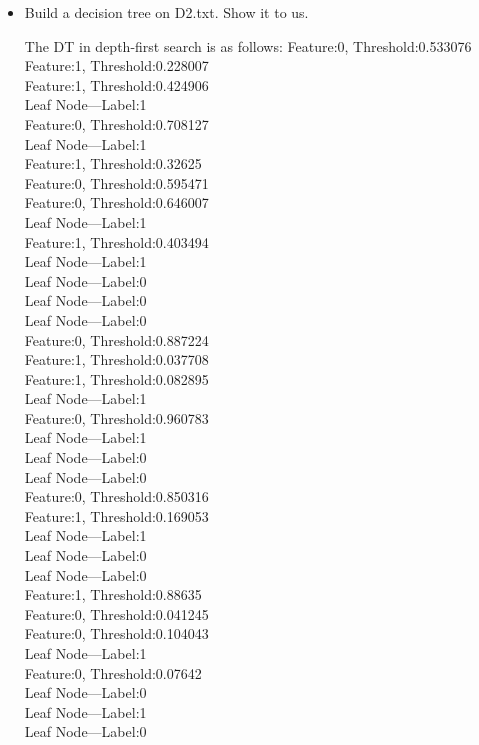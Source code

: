 \documentclass[a4paper]{article}
\theoremstyle{definition}
\newenvironment{soln}{
    \leavevmode\color{blue}\ignorespaces
}{}
\begin{document}
\begin{enumerate}
\begin{itemize}
  \item Build a decision tree on D2.txt.  Show it to us.\\ 
  \begin{soln}
      The DT in depth-first search is as follows:
      Feature:0, Threshold:0.533076\\
Feature:1, Threshold:0.228007\\
Feature:1, Threshold:0.424906\\
Leaf Node---Label:1\\
Feature:0, Threshold:0.708127\\
Leaf Node---Label:1\\
Feature:1, Threshold:0.32625\\
Feature:0, Threshold:0.595471\\
Feature:0, Threshold:0.646007\\
Leaf Node---Label:1\\
Feature:1, Threshold:0.403494\\
Leaf Node---Label:1\\
Leaf Node---Label:0\\
Leaf Node---Label:0\\
Leaf Node---Label:0\\
Feature:0, Threshold:0.887224\\
Feature:1, Threshold:0.037708\\
Feature:1, Threshold:0.082895\\
Leaf Node---Label:1\\
Feature:0, Threshold:0.960783\\
Leaf Node---Label:1\\
Leaf Node---Label:0\\
Leaf Node---Label:0\\
Feature:0, Threshold:0.850316\\
Feature:1, Threshold:0.169053\\
Leaf Node---Label:1\\
Leaf Node---Label:0\\
Leaf Node---Label:0\\
Feature:1, Threshold:0.88635\\
Feature:0, Threshold:0.041245\\
Feature:0, Threshold:0.104043\\
Leaf Node---Label:1\\
Feature:0, Threshold:0.07642\\
Leaf Node---Label:0\\
Leaf Node---Label:1\\
Leaf Node---Label:0\\

\end{soln}
\end{itemize}
\end{enumerate}
\end{document}

